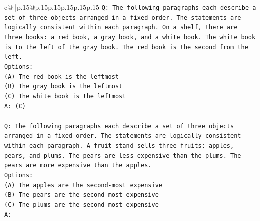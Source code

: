 \documentclass{article}
\begin{document}
{\begin{supertabular}{c@{$\;$}|p{.15\linewidth}@{}p{.15\linewidth}p{.15\linewidth}p{.15\linewidth}p{.15\linewidth}p{.15\linewidth}}
{{{\texttt{Q: The following paragraphs each describe a set of three objects arranged in a fixed order. The statements are logically consistent within each paragraph. On a shelf, there are three books: a red book, a gray book, and a white book. The white book is to the left of the gray book. The red book is the second from the left.} \\
\texttt{Options:} \\
\texttt{(A) The red book is the leftmost} \\
\texttt{(B) The gray book is the leftmost} \\
\texttt{(C) The white book is the leftmost} \\
\texttt{A: (C)} \\
\\ 
\texttt{Q: The following paragraphs each describe a set of three objects arranged in a fixed order. The statements are logically consistent within each paragraph. A fruit stand sells three fruits: apples, pears, and plums. The pears are less expensive than the plums. The pears are more expensive than the apples.} \\
\texttt{Options:} \\
\texttt{(A) The apples are the second{-}most expensive} \\
\texttt{(B) The pears are the second{-}most expensive} \\
\texttt{(C) The plums are the second{-}most expensive} \\
\texttt{A:} \\
            }
        }
    }
     \\ \\


\end{supertabular}}
\end{document}

